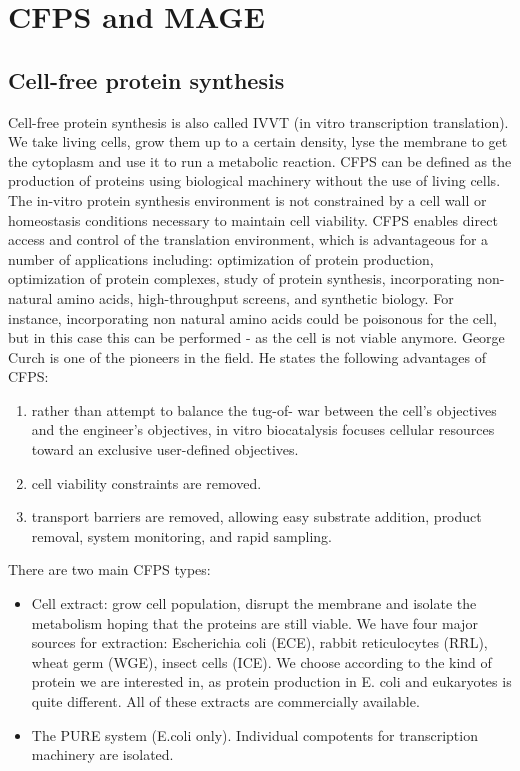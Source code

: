 \graphicspath{{chapters/images/cf_mg/}}
\chapter{CFPS and MAGE}
\section{Cell-free protein synthesis}
Cell-free protein synthesis is also called IVVT (in vitro transcription translation). 
We take living cells, grow them up to a certain density, lyse the membrane to get the cytoplasm and use it to run a metabolic reaction.
CFPS can be defined as the production of proteins using biological machinery without the use of living cells. 
The in-vitro protein synthesis environment is not constrained by a cell wall or homeostasis conditions necessary to maintain cell viability. 
CFPS enables direct access and control of the translation environment, which is advantageous for a number of applications including: optimization of protein production, optimization of protein complexes, study of protein synthesis, incorporating non-natural amino acids, high-throughput screens, and synthetic biology.
For instance,  incorporating non natural amino acids could be poisonous for the cell,  but in this case this can be performed - as the cell is not viable anymore. 
George Curch is one of the pioneers in the field. He states the following advantages of CFPS:
\begin{enumerate}
	\item rather than attempt to balance the tug-of- war between the cell’s objectives and the engineer’s objectives, in vitro biocatalysis focuses cellular resources toward an exclusive user-defined objectives. 
	\item cell viability constraints are removed. 
	\item transport barriers are removed, allowing easy substrate addition, product removal, system monitoring, and rapid sampling. 
\end{enumerate}
\noindent
There are two main CFPS types: 
\begin{itemize}
	\item Cell extract: grow cell population, disrupt the membrane and isolate the metabolism hoping that the proteins are still viable. We have four major sources for extraction: Escherichia coli (ECE), rabbit reticulocytes (RRL), wheat germ (WGE), insect cells (ICE). We choose according to the kind of protein we are interested in, as protein production in E. coli and eukaryotes is quite different.
All of these extracts are commercially available. 
	\item The PURE system (E.coli only). Individual compotents for transcription machinery are isolated.
\end{itemize}

